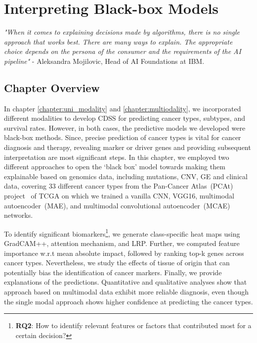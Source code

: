 \chapter{Interpreting Black-box Models}\label{chapter:xai}

\textit{"When it comes to explaining decisions made by algorithms, there is no single approach that works best. There are many ways to explain. The appropriate choice depends on the persona of the consumer and the requirements of the AI pipeline"} - Aleksandra Mojilovic, Head of AI Foundations at IBM. 

\section{Chapter Overview}
In chapter \ref{chapter:uni_modality} and \ref{chapter:multiodality}, we incorporated different modalities to develop CDSS for predicting cancer types, subtypes, and survival rates. However, in both cases, the predictive models we developed were black-box methods. Since, precise prediction of cancer types is vital for cancer diagnosis and therapy, revealing  marker or driver genes and providing subsequent interpretation are most significant steps. In this chapter, we employed two different approaches to open the `black box' model towards making them explainable based on genomics data, including mutations, CNV, GE and clinical data, covering 33 different cancer types from the Pan-Cancer Atlas~(PCAt) project~\cite{weinstein2013cancer} of TCGA on which we trained a vanilla CNN, VGG16, multimodal autoencoder~(MAE), and multimodal convolutional autoencoder~(MCAE) networks.

\hspace*{3.5mm} To identify significant biomarkers\footnote{\textbf{RQ2}: How to identify relevant features or factors that contributed most for a certain decision?}, we generate class-specific heat maps using GradCAM++, attention mechanism, and LRP. Further, we computed feature importance w.r.t mean absolute impact, followed by ranking top-k genes across cancer types. Nevertheless, we study the effects of tissue of origin that can potentially bias the identification of cancer markers. Finally, we provide explanations of the predictions. Quantitative and qualitative analyses show that approach based on multimodal data exhibit more reliable diagnosis, even though the single modal approach shows higher confidence at predicting the cancer types. \label{chapter_5:cw}

